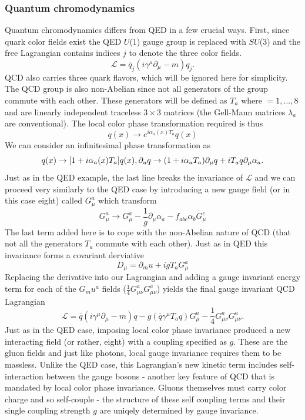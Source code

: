 \subsubsection{Quantum chromodynamics}
Quantum chromodynamics differs from QED in a few crucial ways. First, since quark color fields exist the QED $U$(1) gauge group is replaced with $SU$(3) and the free Lagrangian contains indices $j$ to denote the three color fields. 
\begin{equation}
\mathcal{L} = \bar{q}_j(i\gamma^\mu\partial_\mu - m)q_j.
\end{equation}
QCD also carries three quark flavors, which will be ignored here for simplicity. The QCD group is also non-Abelian since not all generators of the group commute with each other. These generators will be defined as $T_a$ where $=1,...,8$ and are linearly independent traceless $3\times3$ matrices (the Gell-Mann matrices $\lambda_a$ are conventional). The local color phase transformation required is thus 
\begin{equation}
q(x) \rightarrow e^{i\alpha_a(x)T_a}q(x)
\end{equation}
We can consider an infinitesimal phase transformation as 
\begin{equation}
q(x) \rightarrow [1+i\alpha_a(x)T_a]q(x), \\
\partial_uq \rightarrow (1+i\alpha_aT_a)\partial_\mu q + i T_a q \partial_\mu \alpha_a.
\end{equation}
Just as in the QED example, the last line breaks the invariance of $\mathcal{L}$ and we can proceed very similarly to the QED case by introducing a new gauge field (or in this case eight) called $G_\mu^a$ which transform 
\begin{equation}
G_\mu^a \rightarrow G_\mu^a - \frac{1}{g}\partial_\mu\alpha_a - f_{abc}\alpha_b G_\mu^c
\end{equation}
The last term added here is to cope with the non-Abelian nature of QCD (that not all the generators $T_a$ commute with each other). Just as in QED this invariance forms a covariant derviative 
\begin{equation}
D_\mu = \partial_mu + i g T_aG_\mu^a
\end{equation}
Replacing the derivative into our Lagrangian and adding a gauge invariant energy term for each of the $G_mu^a$ fields ($\frac{1}{4}G_{\mu\nu}^a G_{\mu\nu}^a$) yields the final gauge invariant QCD Lagrangian
\begin{equation}
\mathcal{L} = \bar{q}(i\gamma^\mu\partial_\mu - m)q - g(\bar{q}\gamma^\mu T_aq)G_\mu^a-\frac{1}{4}G_{\mu\nu}^aG_{\mu\nu}^a.
\end{equation}
Just as in the QED case, imposing local color phase invariance produced a new interacting field (or rather, eight) with a coupling specified as $g$. These are the gluon fields and just like photons, local gauge invariance requires them to be massless. Unlike the QED case, this Lagrangian's new kinetic term includes self-interaction between the gauge bosons - another key feature of QCD that is mandated by local color phase invariance. Gluons themselves must carry color charge and so self-couple - the structure of these self coupling terms and their single coupling strength $g$ are uniqely determined by gauge invariance. 

